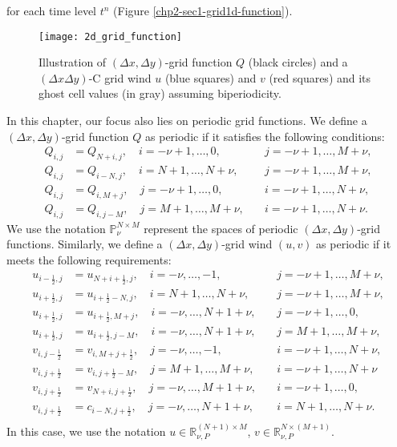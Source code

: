 for each time level $t^n$ (Figure \ref{chp2-sec1-grid1d-function}).
\begin{figure}[!htb]
	\centering
	\texttt{[image: 2d\_grid\_function]}
	\caption{Illustration of $(\Delta x, \Delta y)$-grid function $Q$ (black circles)
		and a $(\Delta x\Delta y)$-C grid wind $u$ (blue squares) and $v$ (red squares) and its ghost cell
		values (in gray) assuming biperiodicity.\label{chp3-sec1-grid2d-function}}
\end{figure}
In this chapter, our focus also lies on periodic grid functions.
We define a $(\Delta x, \Delta y)$-grid function $Q$ as periodic if it satisfies the following conditions:
\begin{align*}
    Q_{i,j} &= Q_{N+i,j}, \quad i=-\nu+1, \ldots, 0,  \quad &j = -\nu+1, \ldots, M+\nu,\\
    Q_{i,j} &= Q_{i-N,j}, \quad i=N+1, \ldots, N+\nu, \quad &j = -\nu+1, \ldots, M+\nu,\\
    Q_{i,j} &= Q_{i,M+j}, \quad j=-\nu+1, \ldots, 0,  \quad &i = -\nu+1, \ldots, N+\nu,\\
    Q_{i,j} &= Q_{i,j-M}, \quad j=M+1, \ldots, M+\nu, \quad &i = -\nu+1, \ldots, N+\nu.
\end{align*}
We use the notation $\mathbb{P}^{N \times M}_{\nu}$ represent the spaces of periodic $(\Delta x, \Delta y)$-grid functions.
Similarly, we define a $(\Delta x, \Delta y)$-grid wind $(u,v)$ as periodic if it meets the following requirements:
\begin{align*}
    u_{i-\frac{1}{2},j} &= u_{N+i+\frac{1}{2},j} , \quad i=-\nu, \ldots, -1,   \quad &j = -\nu+1, \ldots, M+\nu,\\
    u_{i+\frac{1}{2},j} &= u_{i+\frac{1}{2}-N,j} , \quad i=N+1, \ldots, N+\nu, \quad &j = -\nu+1, \ldots, M+\nu,\\
    u_{i+\frac{1}{2},j} &= u_{i+\frac{1}{2},M+j} , \quad i=-\nu, \ldots, N+1+\nu,   \quad &j = -\nu+1, \ldots, 0,\\
    u_{i+\frac{1}{2},j} &= u_{i+\frac{1}{2},j-M} , \quad i=-\nu, \ldots, N+1+\nu,   \quad &j = M+1, \ldots, M+\nu,\\
    v_{i,j-\frac{1}{2}} &= v_{i,M+j+\frac{1}{2}} , \quad j=-\nu, \ldots, -1,   \quad &i = -\nu+1, \ldots, N+\nu,\\
    v_{i,j+\frac{1}{2}} &= v_{i,j+\frac{1}{2}-M} , \quad j=M+1, \ldots, M+\nu, \quad &i = -\nu+1, \ldots, N+\nu\\
    v_{i,j+\frac{1}{2}} &= v_{N+i,j+\frac{1}{2}} , \quad j=-\nu, \ldots, M+1+\nu,   \quad &i = -\nu+1, \ldots, 0,\\
    v_{i,j+\frac{1}{2}} &= c_{i-N,j+\frac{1}{2}} , \quad j=-\nu, \ldots, N+1+\nu,   \quad &i = N+1, \ldots, N+\nu.\\
\end{align*}
In this case, we use the notation $u \in \mathbb{R}^{(N+1) \times M}_{\nu, P}$, 
$v \in \mathbb{R}^{N \times (M+1)}_{\nu, P}$.

